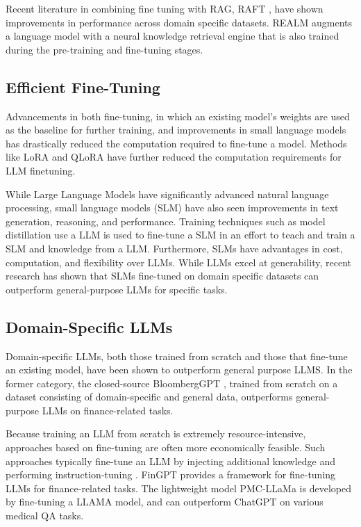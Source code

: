 Recent literature in combining fine tuning with RAG, RAFT \citep{zhang2024raft},
have shown improvements in performance across domain specific datasets. REALM
\citep{guu_realm_2020} augments a language model with a neural knowledge
retrieval engine that is also trained during the pre-training and fine-tuning
stages.

\subsection{Efficient Fine-Tuning}

Advancements in both fine-tuning, in which an existing model’s weights are used
as the baseline for further training, and improvements in small language models
has drastically reduced the computation required to fine-tune a model. Methods
like LoRA \citep{hu2021lora} and QLoRA \cite{dettmers2024qlora} have further
reduced the computation requirements for LLM finetuning.

While Large Language Models have significantly advanced natural language
processing, small language models (SLM) have also seen improvements in text
generation, reasoning, and performance. Training techniques such as model
distillation use a LLM is used to fine-tune a SLM in an effort to teach and
train a SLM and knowledge from a LLM. Furthermore, SLMs have advantages in cost,
computation, and flexibility over LLMs. While LLMs excel at generability, recent
research has shown that SLMs fine-tuned on domain specific datasets can
outperform general-purpose LLMs for specific tasks.

\subsection{Domain-Specific LLMs}

Domain-specific LLMs, both those trained from scratch and those that fine-tune
an existing model, have been shown to outperform general purpose LLMS. In the
former category, the closed-source BloombergGPT \citep{wu_bloomberggpt_2023},
trained from scratch on a dataset consisting of domain-specific and general
data, outperforms general-purpose LLMs on finance-related tasks.

Because training an LLM from scratch is extremely resource-intensive, approaches
based on fine-tuning are often more economically feasible. Such approaches
typically fine-tune an LLM by injecting additional knowledge and performing
instruction-tuning \citep{ouyang_training_2022}. FinGPT \citep{yang_fingpt_2023}
provides a framework for fine-tuning LLMs for finance-related tasks. The
lightweight model PMC-LLaMa \citep{wu_pmc-llama_2023} is developed by
fine-tuning a LLAMA model, and can outperform ChatGPT on various medical QA
tasks.
